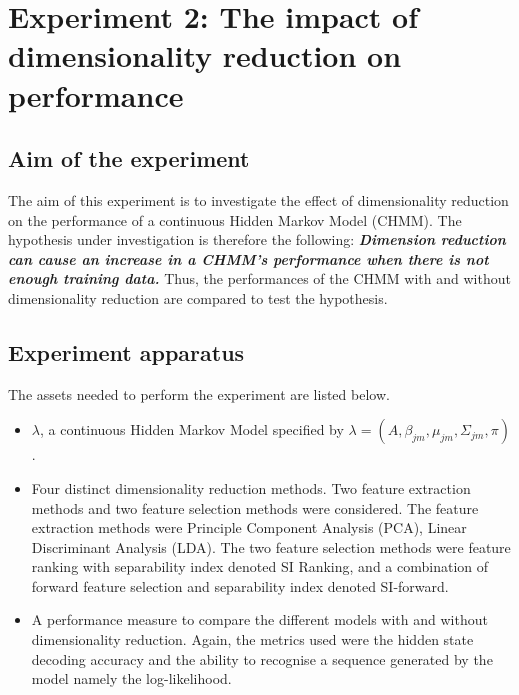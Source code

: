 \section{Experiment 2: The impact of dimensionality reduction on performance}  \label{exp:dim}

\subsection{Aim of the experiment}
The aim of this experiment is to investigate the effect of dimensionality reduction on the performance of a continuous Hidden Markov Model (CHMM).
The hypothesis under investigation is therefore the following:
\textbf{\textit{Dimension reduction can cause an increase in a CHMM's performance when there is not enough training data.}}
Thus, the performances of the CHMM with and without dimensionality reduction are compared to test the hypothesis.

\subsection{Experiment apparatus}
The assets needed to perform the experiment are listed below.
\begin{itemize}
	\item \(\lambda\), a continuous Hidden Markov Model specified by \(\lambda = (A, \beta_{jm}, \mu_{jm}, \Sigma_{jm}, \pi)\).
	\item Four distinct dimensionality reduction methods. Two feature extraction methods and two feature selection methods were considered. The feature extraction methods were Principle Component Analysis (PCA), Linear Discriminant Analysis (LDA). The two feature selection methods were feature ranking with separability index denoted SI Ranking, and a combination of forward feature selection and separability index denoted SI-forward.
	\item A performance measure to compare the different models with and without dimensionality reduction. Again, the metrics used were the hidden state decoding accuracy and the ability to recognise a sequence generated by the model namely the log-likelihood.
\end{itemize}

